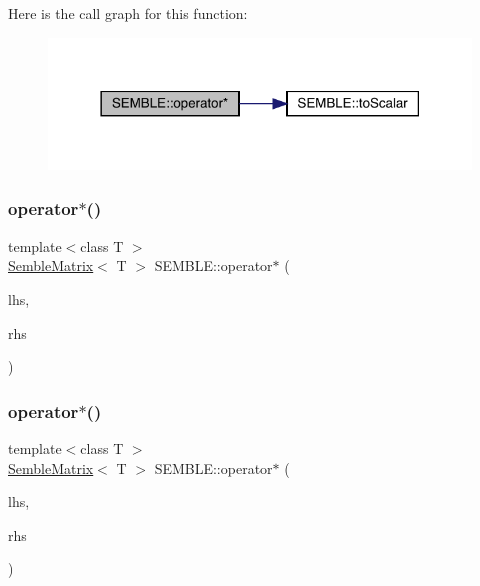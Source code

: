 Here is the call graph for this function\+:
\nopagebreak
\begin{figure}[H]
\begin{center}
\leavevmode
\includegraphics[width=318pt]{d7/dfd/namespaceSEMBLE_a183fae303991bec98acb922d225f9897_cgraph}
\end{center}
\end{figure}
\mbox{\label{namespaceSEMBLE_a1f882fb3141f6c185b31b62c5fe664e3}} 
\subsubsection{\texorpdfstring{operator$\ast$()}{operator*()}\hspace{0.1cm}{\footnotesize\ttfamily [16/20]}}
{\footnotesize\ttfamily template$<$class T $>$ \\
\mbox{\hyperlink{structSEMBLE_1_1SembleMatrix}{Semble\+Matrix}}$<$ T $>$ S\+E\+M\+B\+L\+E\+::operator$\ast$ (\begin{DoxyParamCaption}\item[{const \mbox{\hyperlink{structSEMBLE_1_1SembleMatrix}{Semble\+Matrix}}$<$ T $>$ \&}]{lhs,  }\item[{const typename \mbox{\hyperlink{structSEMBLE_1_1PromoteEnsem}{Promote\+Ensem}}$<$ T $>$\+::Type \&}]{rhs }\end{DoxyParamCaption})}

\mbox{\label{namespaceSEMBLE_af9219234fb26a075ab129f4199f9da05}} 
\subsubsection{\texorpdfstring{operator$\ast$()}{operator*()}\hspace{0.1cm}{\footnotesize\ttfamily [17/20]}}
{\footnotesize\ttfamily template$<$class T $>$ \\
\mbox{\hyperlink{structSEMBLE_1_1SembleMatrix}{Semble\+Matrix}}$<$ T $>$ S\+E\+M\+B\+L\+E\+::operator$\ast$ (\begin{DoxyParamCaption}\item[{const typename \mbox{\hyperlink{structSEMBLE_1_1PromoteEnsem}{Promote\+Ensem}}$<$ T $>$\+::Type \&}]{lhs,  }\item[{const \mbox{\hyperlink{structSEMBLE_1_1SembleMatrix}{Semble\+Matrix}}$<$ T $>$ \&}]{rhs }\end{DoxyParamCaption})}

